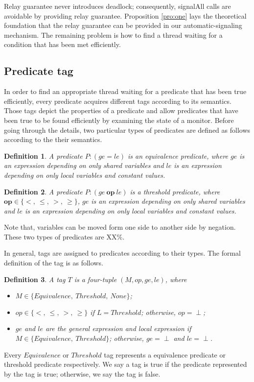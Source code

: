 \documentclass[preprint]{sigplanconf}
\newtheorem{definition}{Definition}
\begin{document}
Relay guarantee never introduces deadlock; consequently, signalAll calls
are avoidable by providing relay guarantee. 
Proposition \ref{pro:one} lays the theoretical foundation that the relay
guarantee can be provided in our automatic-signaling mechanism. 
The remaining problem is how to find a thread waiting for a condition that has 
been met efficiently. 

\subsection{Predicate tag} 
In order to find an appropriate thread waiting for a predicate that has been
true efficiently, every predicate acquires different tags according to its 
semantics. Those tags depict the properties of a predicate and allow predicates
that have been true to be found efficiently by examining the state of a 
monitor. Before going through the details, two particular types of predicates 
are defined as follows according to the their semantics. 
\begin{definition}
    A predicate $P: (ge = le)$ is an equivalence predicate, where $ge$ is an
    expression depending on only shared variables and $le$ is an expression
    depending on only local variables and constant values.
\end{definition}
\begin{definition}
   A predicate $P: (ge\ \boldsymbol{op}\ le)$ is a threshold predicate, where 
   $\boldsymbol{op}
    \in \{<,\ \le,\ >,\ \ge\}$, $ge$ is an
    expression depending on only shared variables and $le$ is an expression
    depending on only local variables and constant values.
\end{definition}
Note that, variables can be moved form one side to another side by negation. 
These two types of predicates are XX\%. 

In general, tags are assigned to predicates according to their types. The 
formal definition of the tag is as follows. 
\begin{definition}
   A tag $T$ is a four-tuple $(M, op, ge, le)$, where  
   \begin{itemize}
      \item $M \in \{Equivalence,\ Threshold,\ None\}$;
      \item $op \in \{<,\ \le,\ >,\ \ge\}$ if $L = Threshold$; otherwise, 
         $op = \perp$;
      \item $ge$ and $le$ are the general expression and local expression if 
          $M \in \{Equivalence,\ Threshold\}$; otherwise, $ge = \perp$
         and $le = \perp$.
   \end{itemize}
\end{definition}
Every $Equivalence$ or $Threshold$ tag represents a equivalence predicate or
threshold predicate respectively. We say a tag is true if the predicate
represented by the tag is true; otherwise, we say the tag is false. 
\end{document}

